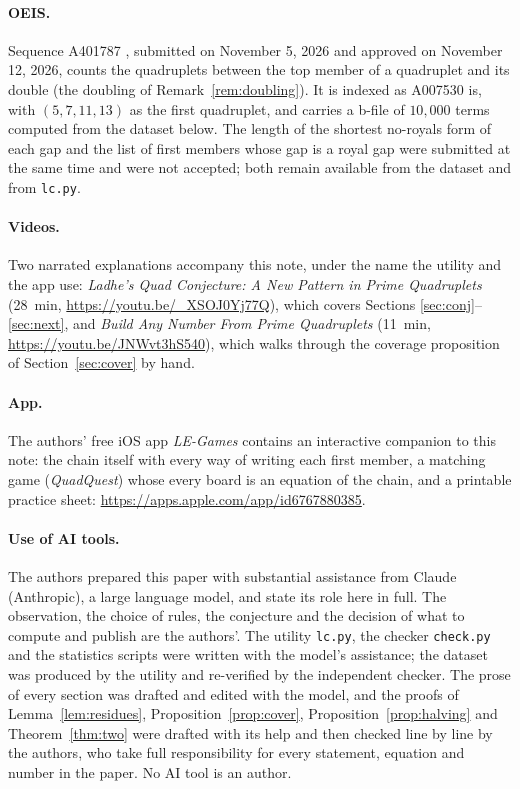 \documentclass[11pt,a4paper]{article}
\newcommand{\code}[1]{\texttt{#1}}
\begin{document}
\paragraph{OEIS.}
Sequence A401787 \cite{OEIS_A401787}, submitted on November 5, 2026 and
approved on November 12, 2026, counts the quadruplets between the top
member of a quadruplet and its double (the doubling of
Remark~\ref{rem:doubling}). It is indexed as A007530 is, with
$(5,7,11,13)$ as the first quadruplet, and carries a b-file of $10{,}000$
terms computed from the dataset below. The length of the shortest
no-royals form of each gap and the list of first members whose gap is a
royal gap were submitted at the same time and were not accepted; both
remain available from the dataset and from \code{lc.py}.

\paragraph{Videos.}
Two narrated explanations accompany this note, under the name the
utility and the app use: \emph{Ladhe's Quad
Conjecture: A New Pattern in Prime Quadruplets} (28~min,
\url{https://youtu.be/_XSOJ0Yj77Q}), which covers Sections
\ref{sec:conj}--\ref{sec:next}, and \emph{Build Any Number From Prime
Quadruplets} (11~min, \url{https://youtu.be/JNWvt3hS540}), which walks
through the coverage proposition of Section~\ref{sec:cover} by hand.

\paragraph{App.}
The authors' free iOS app \emph{LE-Games} contains an interactive companion
to this note: the chain itself with every way of writing each first member,
a matching game (\emph{QuadQuest}) whose every board is an equation of the
chain, and a printable practice sheet:
\url{https://apps.apple.com/app/id6767880385}.

\paragraph{Use of AI tools.}
The authors prepared this paper with substantial assistance from Claude
(Anthropic), a large language model, and state its role here in full. The
observation, the choice of rules, the conjecture and the decision of what to
compute and publish are the authors'. The utility \code{lc.py}, the checker
\code{check.py} and the statistics scripts were written with the model's
assistance; the dataset was produced by the utility and re-verified by the
independent checker. The prose of every section was drafted and edited with
the model, and the proofs of Lemma~\ref{lem:residues},
Proposition~\ref{prop:cover}, Proposition~\ref{prop:halving} and Theorem~\ref{thm:two} were drafted with its help and then
checked line by line by the authors, who take full responsibility for every
statement, equation and number in the paper. No AI tool is an author.
\end{document}
